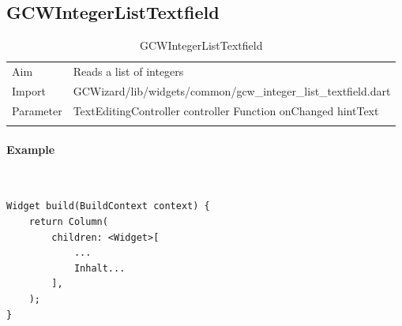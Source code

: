 \subsection{GCWIntegerListTextfield}
\label{fig: GCWIntegerListTextfield}
\begin{table}[H]
\begin{tabular}[h]{p{2cm}p{9cm}}
    \caption{GCWIntegerListTextfield}
    Aim       & Reads a list of integers\\
    Import    & GCWizard/lib/widgets/common/gcw\_integer\_list\_textfield.dart\\
    Parameter & TextEditingController controller\newline
                Function onChanged\newline
                hintText\\
    \label{tab:GCWIntegerListTextfield}
\end{tabular}
\end{table}
\paragraph*{Example} \,
\begin{lstlisting}
Widget build(BuildContext context) {
    return Column(
        children: <Widget>[
            ...
            Inhalt...
        ],
    );
}
\end{lstlisting}
\label{fig: ExampleGCWIntegerListTextfield}

\newpage
